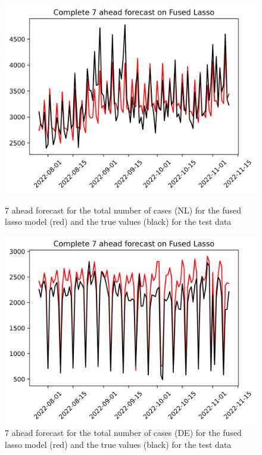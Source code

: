 \begin{figure}

\begin{minipage}{.45\textwidth}
  \centering
  \includegraphics[width=\linewidth]{pics/7_ah/Complete_7_ahead_Fused Lasso.png}
  \caption{7 ahead forecast for the total number of cases (NL) for the fused lasso model (red) and the true values (black) for the test data}
  \label{fig:tot_cases_fc_7_flasso}
\end{minipage}
\begin{minipage}{.45\textwidth}
  \centering
  \includegraphics[width=\linewidth]{pics/7_ah/DE_Complete_7_ahead_Fused Lasso.png}
  \caption{7 ahead forecast for the total number of cases (DE) for the fused lasso model (red) and the true values (black) for the test data}
  \label{fig:tot_cases_fc_7_flasso_DE}
\end{minipage}

\end{figure}
